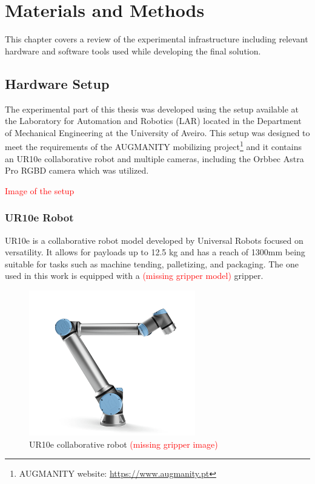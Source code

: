 \chapter{Materials and Methods}
\label{chapter:materials_and_methods}

This chapter covers a review of the experimental infrastructure including relevant hardware and software tools used while developing the final solution.

\section{Hardware Setup}

The experimental part of this thesis was developed using the setup available at the Laboratory for Automation and Robotics (LAR) located in the Department of Mechanical Engineering at the University of Aveiro. This setup was designed to meet the requirements of the AUGMANITY mobilizing project\footnote{AUGMANITY website: \url{https://www.augmanity.pt}} and it contains an UR10e collaborative robot and multiple cameras, including the Orbbec Astra Pro RGBD camera which was utilized.

\textcolor{red}{Image of the setup}

\subsection{UR10e Robot}

UR10e is a collaborative robot model developed by Universal Robots focused on versatility. It allows for payloads up to 12.5 kg and has a reach of 1300mm being suitable for tasks such as machine tending, palletizing, and packaging\cite{UR10e}. The one used in this work is equipped with a \textcolor{red}{(missing gripper model)} gripper.

\begin{figure}[h]
\centerline{\includegraphics[height=2.5in]{figs/UR10e.png}}
\caption[UR10e]{UR10e collaborative robot \cite{UR10e_image} \textcolor{red}{(missing gripper image)}}
\label{fig:ur10e}
\end{figure}

